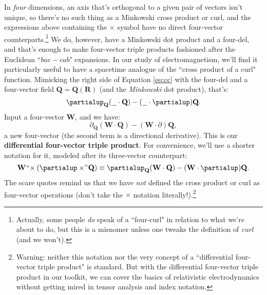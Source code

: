 \documentclass[12pt]{article}
\renewcommand{\vv}[1]{\mathbf{#1}}
\begin{document}
In \emph{four} dimensions, an axis that's orthogonal to a given pair of vectors isn't unique, so there's no such thing as a Minkowski cross product or curl, and the expressions above containing the $\times$ symbol have no direct four-vector counterparts.\footnote{Actually, some people \emph{do} speak of a ``four-curl" in relation to what we're about to do, but this is a misnomer unless one tweaks the definition of \emph{curl} (and we won't).} We do, however, have a Minkowski dot product and a four-del, and that's enough to make four-vector triple products fashioned after the Euclidean ``$bac - cab$" expansions. In our study of electromagnetism, we'll find it particularly useful to have a spacetime analogue of the ``cross product of a curl" function. Mimicking the right side of Equation \ref{eq:cc} with the four-del and a four-vector field $\vv Q = \vv Q (\vv R)$ (and the \emph{Minkowski} dot product), that's:
\begin{equation*}
\partialup_{\vv Q} ( \mkern1.5mu \text{\underline{\hspace{.6em}}} \cdot \vv Q) - ( \mkern1.5mu \text{\underline{\hspace{.6em}}} \cdot \partialup) \vv Q .
\end{equation*}
Input a four-vector $\vv W$, and we have:
\begin{equation*}
\partialup_{\vv Q} ( \vv W \cdot \vv Q) - ( \vv W \cdot \partialup) \vv Q ,
\end{equation*}
a new four-vector (the second term is a directional derivative). This is our \textbf{differential four-vector triple product}. For convenience, we'll use a shorter notation for it, modeled after its three-vector counterpart:
\begin{equation}\label{eq:dtp}
\vv W \mkern1mu `` \mkern-4mu \times (\partialup \times \mkern-4mu " \mkern1mu \vv Q) \equiv \partialup_{\vv Q} ( \vv W \cdot \vv Q) - ( \vv W \cdot \partialup) \vv Q .
\end{equation}
The scare quotes remind us that we have \emph{not} defined the cross product or curl as four-vector operations (don't take the $\times$ notation literally!).\footnote{Warning: neither this notation nor the very concept of a ``differential four-vector triple product" is standard. But with the differential four-vector triple product in our toolkit, we can cover the basics of relativistic electrodynamics without getting mired in tensor analysis and index notation.}
 
\end{document}
